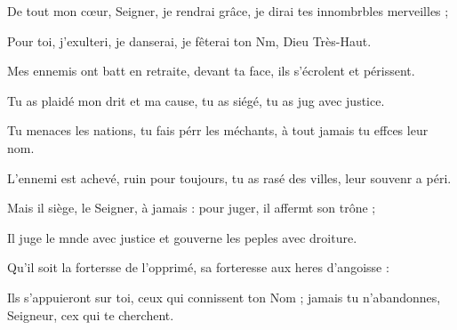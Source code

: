 \item De tout mon cœur, Seigner, je rendrai grâce,\psstar{} je dirai tes innombrbles merveilles ;
\item Pour toi, j’exulteri, je danserai,\psstar{} je fêterai ton Nm, Dieu Très-Haut.
\item Mes ennemis ont batt en retraite,\psstar{} devant ta face, ils s’écrolent et périssent.
\item Tu as plaidé mon drit et ma cause,\psstar{} tu as siégé, tu as jug avec justice.
\item Tu menaces les nations, tu fais pérr les méchants,\psstar{} à tout jamais tu effces leur nom.
\item L’ennemi est achevé, ruin pour toujours,\psstar{} tu as rasé des villes, leur souvenr a péri.
\item Mais il siège, le Seigner, à jamais :\psstar{} pour juger, il affermt son trône ;
\item Il juge le mnde avec justice\psstar{} et gouverne les peples avec droiture.
\item Qu’il soit la fortersse de l’opprimé,\psstar{} sa forteresse aux heres d’angoisse :
\item Ils s’appuieront sur toi, ceux qui connissent ton Nom ;\psstar{} jamais tu n’abandonnes, Seigneur, cex qui te cherchent.